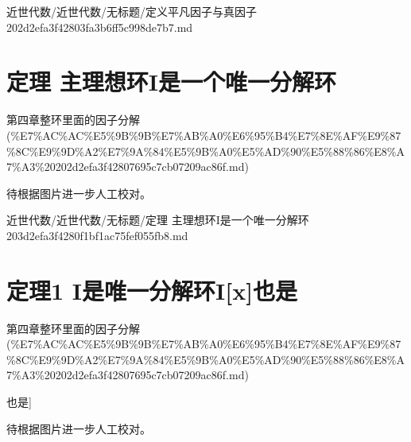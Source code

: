 \begin{note}[来源路径]

近世代数/近世代数/无标题/定义平凡因子与真因子 202d2efa3f42803fa3b6ff5c998de7b7.md

\end{note}

\section*{定理 主理想环I是一个唯一分解环}

\begin{note}[来源上级主题]

第四章整环里面的因子分解 (\%E7\%AC\%AC\%E5\%9B\%9B\%E7\%AB\%A0\%E6\%95\%B4\%E7\%8E\%AF\%E9\%87\%8C\%E9\%9D\%A2\%E7\%9A\%84\%E5\%9B\%A0\%E5\%AD\%90\%E5\%88\%86\%E8\%A7\%A3\%20202d2efa3f42807695c7cb07209ac86f.md)

\end{note}

\begin{theorem}[定理 主理想环I是一个唯一分解环]

待根据图片进一步人工校对。

\end{theorem}

\begin{note}[来源路径]

近世代数/近世代数/无标题/定理 主理想环I是一个唯一分解环 203d2efa3f4280f1bf1ac75fef055fb8.md

\end{note}

\section*{定理1 I是唯一分解环I[x]也是}

\begin{note}[来源上级主题]

第四章整环里面的因子分解 (\%E7\%AC\%AC\%E5\%9B\%9B\%E7\%AB\%A0\%E6\%95\%B4\%E7\%8E\%AF\%E9\%87\%8C\%E9\%9D\%A2\%E7\%9A\%84\%E5\%9B\%A0\%E5\%AD\%90\%E5\%88\%86\%E8\%A7\%A3\%20202d2efa3f42807695c7cb07209ac86f.md)

\end{note}

\begin{theorem}[定理1 I是唯一分解环I[x]也是]

待根据图片进一步人工校对。

\end{theorem}


